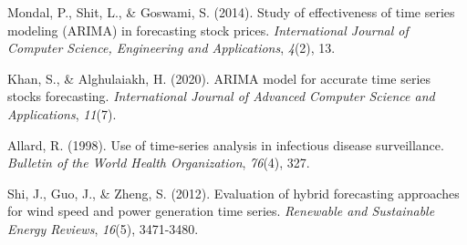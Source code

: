 \documentclass[preprint,12pt]{elsarticle}
\begin{document}
\begin{thebibliography}{99}
Mondal, P., Shit, L., \& Goswami, S. (2014). Study of effectiveness of time series modeling (ARIMA) in forecasting stock prices. \textit{International Journal of Computer Science, Engineering and Applications}, \textit{4}(2), 13.

Khan, S., \& Alghulaiakh, H. (2020). ARIMA model for accurate time series stocks forecasting. \textit{International Journal of Advanced Computer Science and Applications}, \textit{11}(7).

Allard, R. (1998). Use of time-series analysis in infectious disease surveillance. \textit{Bulletin of the World Health Organization}, \textit{76}(4), 327.

Shi, J., Guo, J., \& Zheng, S. (2012). Evaluation of hybrid forecasting approaches for wind speed and power generation time series. \textit{Renewable and Sustainable Energy Reviews}, \textit{16}(5), 3471-3480.

\end{thebibliography}

\end{document}
